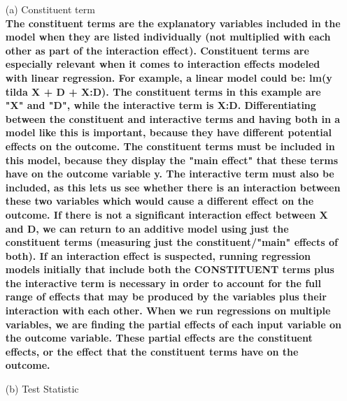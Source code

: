 \documentclass[12pt,letterpaper]{article}
\begin{document}
	\begin{enumerate}
	\item [(a)] Constituent term
	\\
	\textbf{The constituent terms are the explanatory variables included in the model when they are listed individually (not multiplied with each other as part of the interaction effect). Constituent terms are especially relevant when it comes to interaction effects modeled with linear regression.  For example, a linear model could be: lm(y tilda X + D + X:D). The constituent terms in this example are "X" and "D", while the interactive term is X:D. Differentiating between the constituent and interactive terms and having both in a model like this is important, because they have different potential effects on the outcome. The constituent terms must be included in this model, because they display the "main effect" that these terms have on the outcome variable y. The interactive term must also be included, as this lets us see whether there is an interaction between these two variables which would cause a different effect on the outcome. If there is not a significant interaction effect between X and D, we can return to an additive model using just the constituent terms (measuring just the constituent/"main" effects of both). If an interaction effect is suspected, running regression models initially that include both the CONSTITUENT terms plus the interactive term is necessary in order to account for the full range of effects that may be produced by the variables plus their interaction with each other. When we run regressions on multiple variables, we are finding the partial effects of each input variable on the outcome variable. These partial effects are the constituent effects, or the effect that the constituent terms have on the outcome.}
		
	\item [(b)] Test Statistic
	

\end{enumerate}
\end{document}
